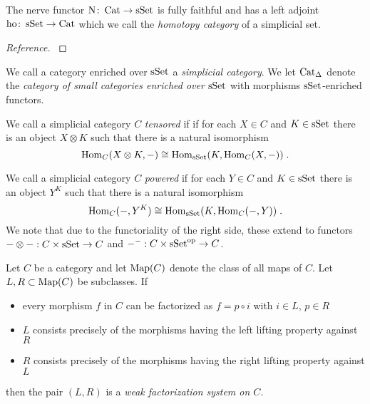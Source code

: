 \begin{lemma}
    The nerve functor $\operatorname{N}\colon\operatorname{Cat}\to\operatorname{sSet}$ is fully faithful and has a left adjoint $\operatorname{ho}\colon\operatorname{sSet}\to\operatorname{Cat}$ which we call the \emph{homotopy category} of a simplicial set.
    \begin{proof}[Reference]
        \cite[Proposition 1.2.2.1]{kerodon}
    \end{proof}
\end{lemma}
\begin{definition}
    We call a category enriched over $\operatorname{sSet}$ a \emph{simplicial category}.
    We let $\operatorname{Cat}_{\Delta}$ denote the \emph{category of small categories enriched over $\operatorname{sSet}$} with morphisms $\operatorname{sSet}$-enriched functors.
    
    We call a simplicial category $C$ \emph{tensored} if if for each $X\in C$ and $K\in\operatorname{sSet}$ there is an object $X\otimes K$ such that there is a natural isomorphism
    \begin{equation*}
        \operatorname{Hom}_C(X\otimes K,-)\cong\operatorname{Hom}_{\operatorname{sSet}}(K,\operatorname{Hom}_C(X,-))\;.
    \end{equation*}

    We call a simplicial category $C$ \emph{powered} if for each $Y\in C$ and $K\in\operatorname{sSet}$ there is an object $Y^K$ such that there is a natural isomorphism
    \begin{equation*}
        \operatorname{Hom}_C(-,Y^K)\cong\operatorname{Hom}_{\operatorname{sSet}}(K,\operatorname{Hom}_C(-,Y))\;.
    \end{equation*}
    We note that due to the functoriality of the right side, these extend to functors $-\otimes -:C\times\operatorname{sSet}\to C$ and $-^-:C\times\operatorname{sSet}^{\operatorname{op}}\to C$.
\end{definition}
\begin{definition}
    Let $C$ be a category and let $\operatorname{Map}(C)$ denote the class of all maps of $C$.
    Let $L,R\subset\operatorname{Map}(C)$ be subclasses.
    If 
    \begin{itemize}
        \item every morphism $f$ in $C$ can be factorized as $f=p\circ i$ with $i\in L$, $p\in R$
        \item $L$ consists precisely of the morphisms having the left lifting property against $R$
        \item $R$ consists precisely of the morphisms having the right lifting property against $L$
    \end{itemize}
    then the pair $(L,R)$ is a \emph{weak factorization system on $C$}.
\end{definition}
